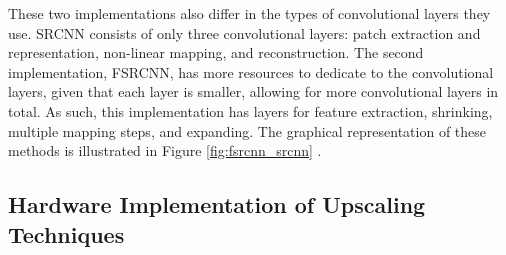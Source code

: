 \documentclass{article}
\begin{document}
    \par These two implementations also differ in the types of convolutional layers they use. SRCNN consists of only three convolutional layers: patch extraction and representation, non-linear mapping, and reconstruction. The second implementation, FSRCNN, has more resources to dedicate to the convolutional layers, given that each layer is smaller, allowing for more convolutional layers in total. As such, this implementation has layers for feature extraction, shrinking, multiple mapping steps, and expanding. The graphical representation of these methods is illustrated in Figure \ref{fig:fsrcnn_srcnn} \cite{fsrcnn_dong_accelerating_2016}. 

    
    \subsection{Hardware Implementation of Upscaling Techniques}
\end{document}

